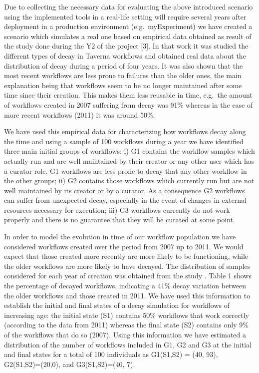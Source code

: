 Due to collecting the necessary data for evaluating the above introduced
scenario using the implemented tools in a real-life setting will require
several years after deployment in a production environment
(e.g.~myExperiment) we have created a scenario which simulates a real
one based on empirical data obtained as result of the study done during
the Y2 of the project {[}3{]}. In that work it was studied the different
types of decay in Taverna workflows and obtained real data about the
distribution of decay during a period of four years. It was also shown
that the most recent workflows are less prone to failures than the older
ones, the main explanation being that workflows seem to be no longer
maintained after some time since their creation. This makes them less
reusable in time, e.g.~the amount of workflows created in 2007 suffering
from decay was 91\% whereas in the case of more recent workflows (2011)
it was around 50\%.

We have used this empirical data for characterizing how workflows decay
along the time and using a sample of 100 workflows during a year we have
identified three main initial groups of workflows: i) G1 contains the
workflow samples which actually run and are well maintained by their
creator or any other user which has a curator role. G1 workflows are
less prone to decay that any other workflow in the other groups; ii) G2
contains those workflows which currently run but are not well maintained
by its creator or by a curator. As a consequence G2 workflows can suffer
from unexpected decay, especially in the event of changes in external
resources necessary for execution; iii) G3 workflows currently do not
work properly and there is no guarantee that they will be curated at
some point.

In order to model the evolution in time of our workflow population we
have considered workflows created over the period from 2007 up to 2011.
We would expect that those created more recently are more likely to be
functioning, while the older workflows are more likely to have decayed.
The distribution of samples considered for each year of creation was
obtained from the study \cite{Zhao-2012}. Table 1 shows the percentage
of decayed workflows, indicating a 41\% decay variation between the
older workflows and those created in 2011. We have used this information
to establish the initial and final states of a decay simulation for
workflows of increasing age: the initial state (S1) contains 50\%
workflows that work correctly (according to the data from 2011) whereas
the final state (S2) contains only 9\% of the workflows that do so
(2007). Using this information we have estimated a distribution of the
number of workflows included in G1, G2 and G3 at the initial and final
states for a total of 100 individuals as G1(S1,S2) = (40, 93),
G2(S1,S2)=(20,0), and G3(S1,S2)=(40, 7).

